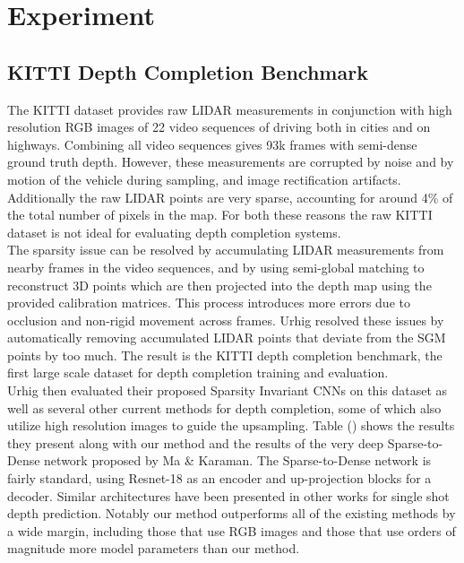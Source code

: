 \section{Experiment}




\subsection{KITTI Depth Completion Benchmark}
\label{sec:kitti-depth-compl}

The KITTI dataset provides raw LIDAR measurements in conjunction with high resolution RGB images of 22 video sequences of driving both in cities and on highways. Combining all video sequences gives 93k frames with semi-dense ground truth depth. However, these measurements are corrupted by noise and by motion of the vehicle during sampling, and image rectification artifacts. Additionally the raw LIDAR points are very sparse, accounting for around 4\% of the total number of pixels in the map. For both these reasons the raw KITTI dataset is not ideal for evaluating depth completion systems.\\

The sparsity issue can be resolved by accumulating LIDAR measurements from nearby frames in the video sequences, and by using semi-global matching to reconstruct 3D points which are then projected into the depth map using the provided calibration matrices. This process introduces more errors due to occlusion and non-rigid movement across frames. Urhig \etall resolved these issues by automatically removing accumulated LIDAR points that deviate from the SGM points by too much. The result is the KITTI depth completion benchmark, the first large scale dataset for depth completion training and evaluation.\\

Urhig \etal then evaluated their proposed Sparsity Invariant CNNs on this dataset as well as several other current methods for depth completion, some of which also utilize high resolution images to guide the upsampling. Table () shows the results they present along with our method and the results of the very deep Sparse-to-Dense network proposed by Ma \& Karaman. The Sparse-to-Dense network is fairly standard, using Resnet-18 as an encoder and up-projection blocks for a decoder. Similar architectures have been presented in other works for single shot depth prediction. Notably our method outperforms all of the existing methods by a wide margin, including those that use RGB images and those that use orders of magnitude more model parameters than our method.

